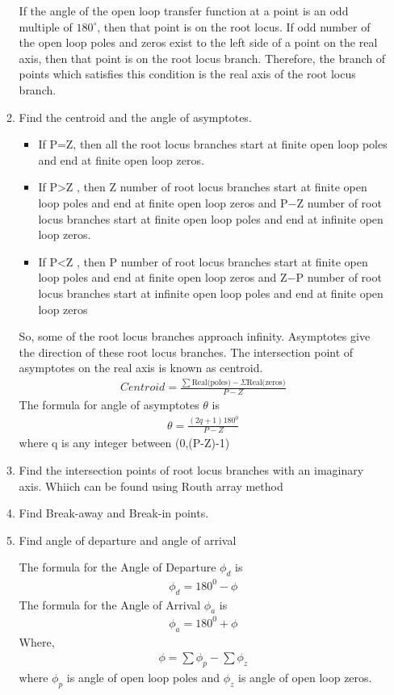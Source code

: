 \begin{enumerate}[label=\thesection.\arabic*.,ref=\thesection.\theenumi]
\begin{enumerate}
 If the angle of the open loop transfer function at a point is an odd multiple of $180^{\circ}$, then that point is on the root locus. If odd number of the open loop poles and zeros exist to the left side of a point on the real axis, then that point is on the root locus branch. Therefore, the branch of points which satisfies this condition is the real axis of the root locus branch.
	\item Find the centroid and the angle of asymptotes.
	\begin{itemize}
	\item If P=Z, then all the root locus branches start at finite open loop poles and end at finite open loop zeros.
	\item If P>Z , then Z number of root locus branches start at finite open loop poles and end at finite open loop zeros and P−Z number of root locus branches start at finite open loop poles and end at infinite open loop zeros.
	\item If P<Z , then P number of root locus branches start at finite open loop poles and end at finite open loop zeros and Z−P number of root locus branches start at infinite open loop poles and end at finite open loop zeros

	\end{itemize}
So, some of the root locus branches approach infinity. Asymptotes give the direction of these root locus branches. The intersection point of asymptotes on the real axis is known as centroid.
\begin{align}
Centroid =\frac{\sum \text {Real(poles)}-\Sigma \text {Real(zeros)}}{P-Z}
\end{align}
The formula for angle of asymptotes $\theta$ is
\begin{align}
\theta=\frac{(2 q+1) 180^{0}}{P-Z}
\end{align}
where q is any integer between (0,(P-Z)-1)


	\item Find the intersection points of root locus branches with an imaginary axis. Whiich can be found using Routh array method
	\item Find Break-away and Break-in points.
	\item Find angle of departure and angle of arrival

The formula for the Angle of Departure $\phi_{d}$ is
\begin{align}
\phi_{d}=180^{0}-\phi
\end{align}
The formula for the Angle of Arrival $\phi_{a}$ is
\begin{align}
\phi_{a}=180^{0}+\phi
\end{align}
Where,
\begin{align}
\phi=\sum \phi_{p}-\sum \phi_{z}
\end{align}
where $\phi_{p}$ is angle of open loop poles and $\phi_{z}$ is angle of open loop zeros.
     \end{enumerate}
    

\end{enumerate}
